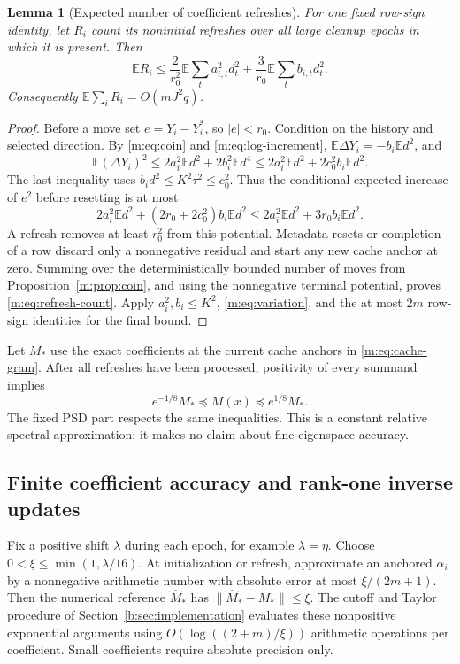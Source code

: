 \documentclass[11pt]{amsart}
\newtheorem{lemma}[theorem]{Lemma}
\theoremstyle{definition}\newtheorem{definition}[theorem]{Definition}
\theoremstyle{remark}\newtheorem{remark}[theorem]{Remark}
\numberwithin{equation}{section}
\begin{document}
\begin{lemma}[Expected number of coefficient refreshes]\label{m:lem:refresh}
For one fixed row-sign identity, let $R_i$ count its noninitial refreshes
over all large cleanup epochs in which it is present. Then
\begin{equation}
 \mathbb E R_i\le\frac2{r_0^2}\mathbb E\sum_ta_{i,t}^2d_t^2
                  +\frac3{r_0}\mathbb E\sum_tb_{i,t}d_t^2.
                                                               \label{m:eq:refresh-count}
\end{equation}
Consequently $\mathbb E\sum_iR_i=O(mJ^2q)$.
\end{lemma}
\begin{proof}
Before a move set $e=Y_i-Y_i^*$, so $|e|<r_0$.
Condition on the history and selected direction. By
\eqref{m:eq:coin} and \eqref{m:eq:log-increment},
$\mathbb E\Delta Y_i=-b_i\mathbb E d^2$, and
\[
 \mathbb E(\Delta Y_i)^2
 \le2a_i^2\mathbb E d^2+2b_i^2\mathbb E d^4
 \le2a_i^2\mathbb E d^2+2c_0^2b_i\mathbb E d^2.
\]
The last inequality uses $b_i d^2\le K^2\tau^2\le c_0^2$.
Thus the conditional expected increase of $e^2$ before resetting is at most
\[
 2a_i^2\mathbb E d^2+(2r_0+2c_0^2)b_i\mathbb E d^2
 \le2a_i^2\mathbb E d^2+3r_0b_i\mathbb E d^2.
\]
A refresh removes at least $r_0^2$ from this potential. Metadata resets or
completion of a row discard only a nonnegative residual and start any new
cache anchor at zero. Summing over the deterministically bounded number
of moves from Proposition~\ref{m:prop:coin}, and using the nonnegative
terminal potential, proves \eqref{m:eq:refresh-count}. Apply
$a_i^2,b_i\le K^2$, \eqref{m:eq:variation}, and the at most $2m$ row-sign
identities for the final bound.
\end{proof}

Let $M_*$ use the exact coefficients at the current cache anchors in
\eqref{m:eq:cache-gram}. After all refreshes have been processed,
positivity of every summand implies
\begin{equation}
                e^{-1/8}M_*\preceq M(x)\preceq e^{1/8}M_*.
                                                               \label{m:eq:cache-loewner}
\end{equation}
The fixed PSD part respects the same inequalities. This is a constant
relative spectral approximation; it makes no claim about fine eigenspace
accuracy.

\subsection{Finite coefficient accuracy and rank-one inverse updates}
\label{m:subsec:cache-arithmetic}
Fix a positive shift $\lambda$ during each epoch, for example $\lambda=\eta$.
Choose $0<\xi\le\min(1,\lambda/16)$. At initialization or refresh,
approximate an anchored $\alpha_i$ by a nonnegative arithmetic number
with absolute error at most $\xi/(2m+1)$. Then the numerical reference
$\widehat M_*$ has $\|\widehat M_*-M_*\|\le\xi$.
The cutoff and Taylor procedure of Section~\ref{b:sec:implementation}
evaluates these nonpositive exponential arguments using
$O(\log((2+m)/\xi))$ arithmetic operations per coefficient.
Small coefficients require absolute precision only.
\end{document}
